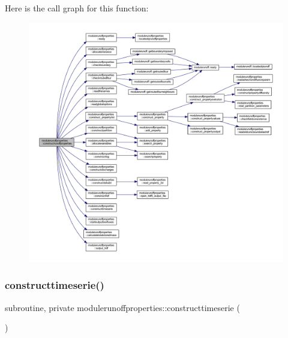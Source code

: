 Here is the call graph for this function\+:\nopagebreak
\begin{figure}[H]
\begin{center}
\leavevmode
\includegraphics[width=350pt]{namespacemodulerunoffproperties_a9b600e1ea55d398dd1ac832de05eccba_cgraph}
\end{center}
\end{figure}
\mbox{\label{namespacemodulerunoffproperties_a00eb7dbee6a76f3b846621e0aad282c0}} 
\subsubsection{\texorpdfstring{constructtimeserie()}{constructtimeserie()}}
{\footnotesize\ttfamily subroutine, private modulerunoffproperties\+::constructtimeserie (\begin{DoxyParamCaption}{ }\end{DoxyParamCaption})\hspace{0.3cm}{\ttfamily [private]}}

